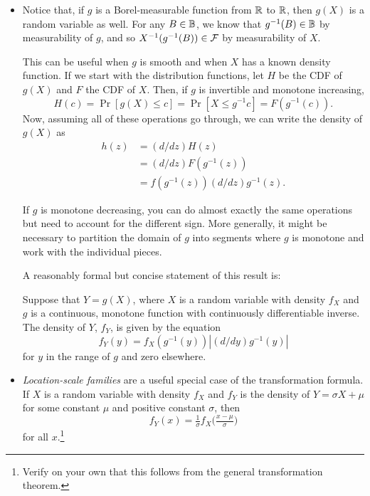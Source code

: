 \begin{itemize}

\item Notice that, if $g$ is a Borel-measurable function from $\mathbb{R}$ to
  $\mathbb{R}$, then $g(X)$ is a random variable as well.  For any $B \in \mathbb{B}$,
  we know that $g^{-1}(B) \in \mathbb{B}$ by measurability of $g$, and so
  $X^{-1}(g^{-1}(B)) \in \mathcal{F}$ by measurability of $X$.

  This can be useful when $g$ is smooth and when $X$ has a known
  density function.  If we start with the distribution functions, let
  $H$ be the CDF of $g(X)$ and $F$ the CDF of $X$.  Then, if $g$ is
  invertible and monotone increasing,
  \begin{equation*}
    H(c) = \Pr[g(X) \leq c] = \Pr[X \leq g^{-1} c] = F(g^{-1}(c)).
  \end{equation*}
  Now, assuming all of these operations go through, we can write the
  density of $g(X)$ as
  \begin{align*}
    h(z) &= (d/dz) H(z) \\
    &= (d/dz) F(g^{-1}(z)) \\
    &= f(g^{-1}(z)) (d/dz) g^{-1}(z).
  \end{align*}

  If $g$ is monotone decreasing, you can do almost exactly the same
  operations but need to account for the different sign.  More
  generally, it might be necessary to partition the domain of $g$ into
  segments where $g$ is monotone and work with the individual pieces.

  A reasonably formal but concise statement of this result is:
  \begin{thm}
    Suppose that $Y = g(X)$, where $X$ is a random variable with density
    $f_X$ and $g$ is a continuous, monotone function with continuously
    differentiable inverse.  The density of $Y$, $f_Y$, is given by the
    equation
    \begin{equation}
      f_Y(y) = f_X(g^{-1}(y)) | (d/dy) g^{-1}(y) |
    \end{equation}
    for $y$ in the range of $g$ and zero elsewhere.
  \end{thm}

\item \emph{Location-scale families} are a useful special case of the
  transformation formula.  If $X$ is a random variable with density
  $f_X$ and $f_Y$ is the density of $Y = \sigma X + \mu$ for some constant
  $\mu$ and positive constant $\sigma$, then
  \begin{equation*}
    f_Y(x) = \tfrac{1}{\sigma} f_X\big( \tfrac{x - \mu}{\sigma} \big)
  \end{equation*}
  for all $x$.\footnote{Verify on your own that this follows from the
  general transformation theorem.}


\end{itemize}
